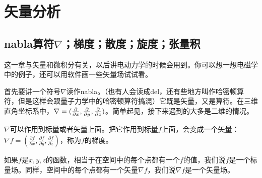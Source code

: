 \chapter{矢量分析}
\section{nabla算符$\nabla$；梯度；散度；旋度；张量积}
这一章与矢量和微积分有关，以后讲电动力学的时候会用到。你可以想一想电磁学中的例子，还可以用软件画一些矢量场试试看。

首先要讲一个符号$\nabla$读作nabla。（也有人会读成del，还有些地方叫作哈密顿算符，但是这样会跟量子力学中的哈密顿算符搞混）它既是矢量，又是算符。在三维直角坐标系中，$\nabla=(\frac{\partial}{\partial x},\frac{\partial}{\partial y},\frac{\partial}{\partial z})$。简单起见，接下来遇到的大多是二维的情况。

$\nabla$可以作用到标量或者矢量上面。把它作用到标量$f$上面，会变成一个矢量：$\nabla f=(\frac{\partial f}{\partial x},\frac{\partial f}{\partial y},\frac{\partial f}{\partial z})$，称为$f$的梯度。

如果$f$是$x,y,z$的函数，相当于在空间中的每个点都有一个$f$的值，我们说$f$是一个标量场。同样，空间中的每个点都有一个矢量$\nabla f$，我们说$\nabla f$是一个矢量场。

